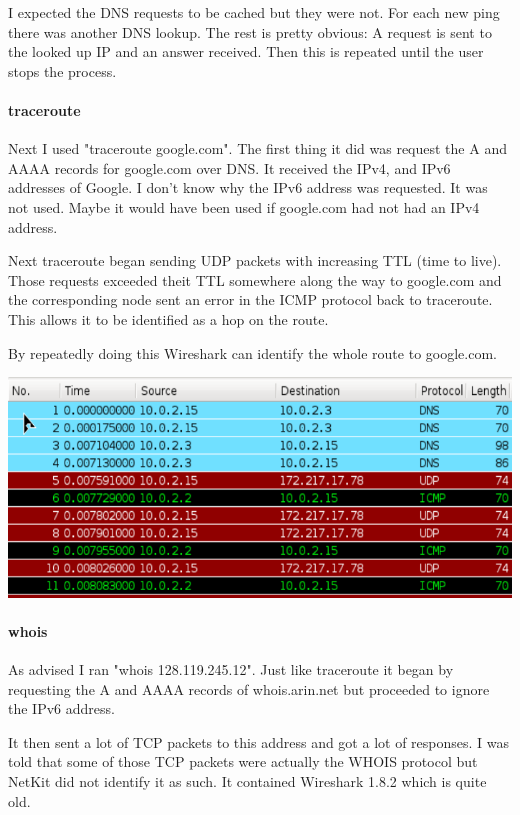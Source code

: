 \documentclass[12pt, a4paper]{article}
\begin{document}
\begin{enumerate}[a]
	I expected the DNS requests to be cached but they were not. For each new ping there was another DNS lookup. The rest is pretty obvious: A request is sent to the looked up IP and an answer received. Then this is repeated until the user stops the process.

	\paragraph{traceroute}
	Next I used "traceroute google.com". The first thing it did was request the A and AAAA records for google.com over DNS. It received the IPv4, and IPv6 addresses of Google. I don't know why the IPv6 address was requested. It was not used. Maybe it would have been used if google.com had not had an IPv4 address.

	Next traceroute began sending UDP packets with increasing TTL (time to live). Those requests exceeded theit TTL somewhere along the way to google.com and the corresponding node sent an error in the ICMP protocol back to traceroute. This allows it to be identified as a hop on the route.

	By repeatedly doing this Wireshark can identify the whole route to google.com.

	\includegraphics[width=\linewidth]{images/traceroute}

	\paragraph{whois}
	As advised I ran "whois 128.119.245.12". Just like traceroute it began by requesting the A and AAAA records of whois.arin.net but proceeded to ignore the IPv6 address.

	It then sent a lot of TCP packets to this address and got a lot of responses. I was told that some of those TCP packets were actually the WHOIS protocol but NetKit did not identify it as such. It contained Wireshark 1.8.2 which is quite old.


\end{enumerate}
\end{document}
